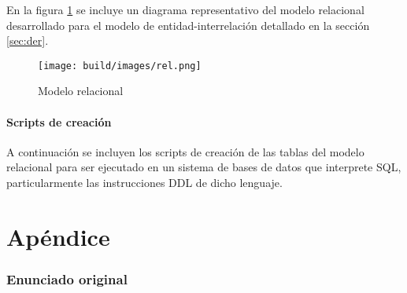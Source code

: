 \documentclass[a4paper,11pt]{article}
\begin{document}
En la figura \ref{fig:relacional} se incluye un diagrama representativo del
modelo relacional desarrollado para el modelo de entidad-interrelación
detallado en la sección \ref{sec:der}.

\begin{figure}[h!t]
  \centering
  \texttt{[image: build/images/rel.png]}
  \caption{Modelo relacional} \label{fig:relacional}
\end{figure}

\FloatBarrier

\subsection{Scripts de creación}

A continuación se incluyen los scripts de creación de las tablas del modelo
relacional para ser ejecutado en un sistema de bases de datos que interprete
SQL, particularmente las instrucciones DDL de dicho lenguaje.



\clearpage

\part{Apéndice}
\appendix

\section{Enunciado original}\label{sec:enunciado}

\end{document}

